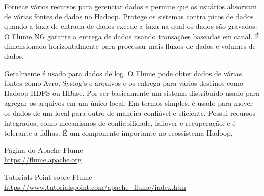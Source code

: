 \documentclass[a4paper,11pt]{article}
\begin{document}
Fornece vários recursos para gerenciar dados e permite que os usuários absorvam de várias fontes de dados no Hadoop. Protege os sistemas contra picos de dados quando a taxa de entrada de dados excede a taxa na qual os dados são gravados. O Flume NG garante a entrega de dados usando transações baseadas em canal. É dimensionado horizontalmente para processar mais fluxos de dados e volumes de dados.

Geralmente é usado para dados de log. O Flume pode obter dados de várias fontes como Avro, Syslog’s e arquivos e os entrega para vários destinos como Hadoop HDFS ou HBase. Por ser basicamente um sistema distribuído usado para agregar os arquivos em um único local. Em termos simples, é usado para mover os dados de um local para outro de maneira confiável e eficiente. Possui recursos integrados, como mecanismos de confiabilidade, failover e recuperação, e é tolerante a falhas. É um componente importante no ecossistema Hadoop.



\begin{thebibliography}{4}
	Página do Apache Flume \\
	\url{https://flume.apache.org}

	Tutorials Point sobre Flume \\
	\url{https://www.tutorialspoint.com/apache_flume/index.htm}
	
	
\end{thebibliography}
\end{document}
